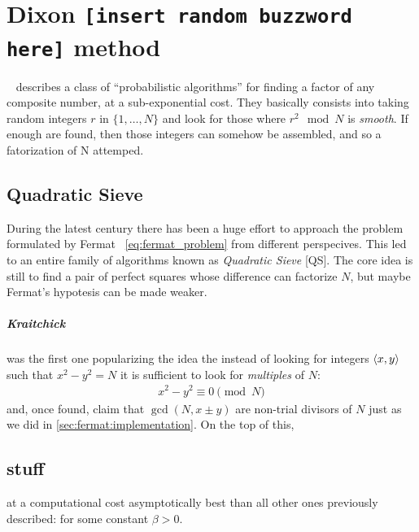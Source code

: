 \chapter{Dixon {\texttt{\small{[insert random buzzword here]}}} method\label{chap:dixon}}

~\cite{dixon} describes a class of ``probabilistic algorithms'' for finding a
factor of any composite number, at a sub-exponential cost. They basically
consists into taking random integers $r$ in $\{1, \ldots, N\}$ and look for those
where $r^2 \mod{N}$ is \emph{smooth}. If enough are found, then those integers
can somehow be assembled, and so a fatorization of N attemped.


\section{Quadratic Sieve}
During the latest century there has been a huge effort to approach the problem
formulated by Fermat ~\ref{eq:fermat_problem} from different perspecives. This
led to an entire family of algorithms known as \emph{Quadratic Sieve} [QS]. The
core idea is still to find a pair of perfect squares whose difference can
factorize $N$, but maybe Fermat's hypotesis can be made weaker.

\paragraph{Kraitchick} was the first one popularizing the idea the instead of
looking for integers $\langle x, y\rangle$ such that $x^2 -y^2 = N$ it is sufficient
to look for \emph{multiples} of $N$:
\begin{align}
  x^2 - y^2 \equiv 0 \pmod{N}
\end{align}
and, once found, claim that $\gcd(N, x \pm y)$ are non-trial divisors of $N$
just as we did in \ref{sec:fermat:implementation}.
On the top of this,

\section{stuff}

at a computational cost asymptotically  best
than all other ones previously described:
for some constant $\beta > 0$.

